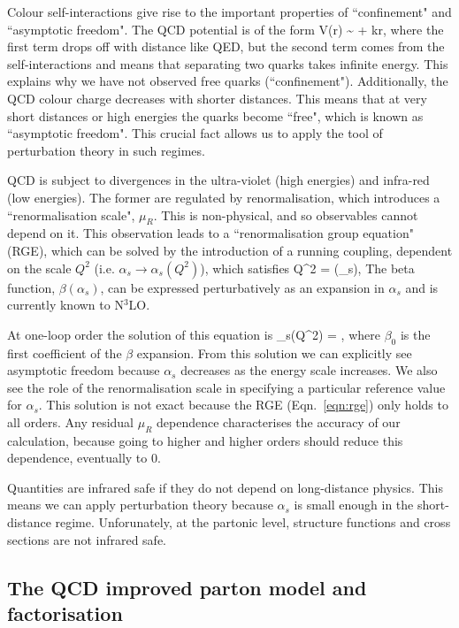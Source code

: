 Colour self-interactions give rise to the important properties of ``confinement" and ``asymptotic freedom". The QCD potential is of the form
\be 
V(r) \sim {} + kr,
\ee
where the first term drops off with distance like QED, but the second term comes from the self-interactions and means that separating two quarks takes infinite energy. This explains why we have not observed free quarks (``confinement"). Additionally, the QCD colour charge decreases with shorter distances. This means that at very short distances or high energies the quarks become ``free", which is known as ``asymptotic freedom". This crucial fact allows us to apply the tool of perturbation theory in such regimes. 

QCD is subject to divergences in the ultra-violet (high energies) and infra-red (low energies). The former are regulated by renormalisation, which introduces a ``renormalisation scale", $\mu_R$. This is non-physical, and so observables cannot depend on it. This observation leads to a ``renormalisation group equation" (RGE), which can be solved by the introduction of a running coupling, dependent on the scale $Q^2$ (i.e. $\alpha_s \to \alpha_s(Q^2)$), which satisfies
\be
\label{eqn:rge}
Q^2  = \beta (\alpha_s),
\ee
The beta function, $\beta(\alpha_s)$, can be expressed perturbatively as an expansion in $\alpha_s$ and is currently known to N$^3$LO.

At one-loop order the solution of this equation is
\be 
\alpha_s(Q^2) = ,
\ee
where $\beta_0$ is the first coefficient of the $\beta$ expansion. From this solution we can explicitly see asymptotic freedom because $\alpha_s$ decreases as the energy scale increases. We also see the role of the renormalisation scale in specifying a particular reference value for $\alpha_s$. This solution is not exact because the RGE (Eqn.~\ref{eqn:rge}) only holds to all orders. Any residual $\mu_R$ dependence characterises the accuracy of our calculation, because going to higher and higher orders should reduce this dependence, eventually to 0.

Quantities are infrared safe if they do not depend on long-distance physics. This means we can apply perturbation theory because $\alpha_s$ is small enough in the short-distance regime. Unforunately, at the partonic level, structure functions and cross sections are not infrared safe. 

\subsection{The QCD improved parton model and factorisation}

